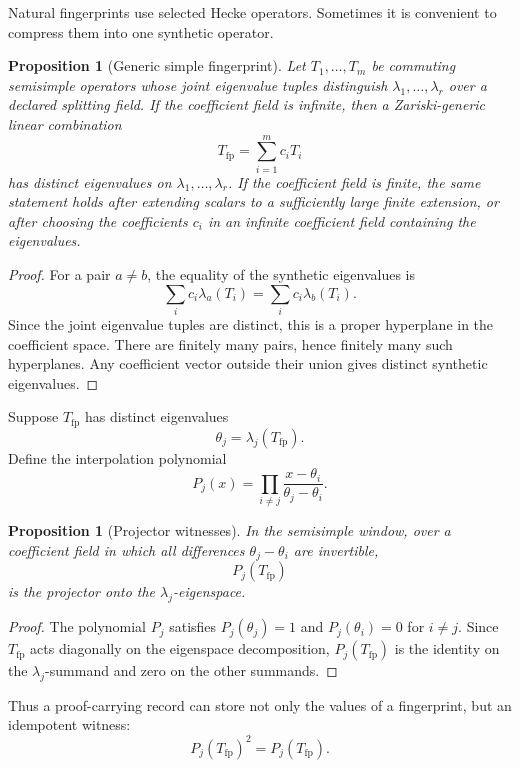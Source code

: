 \documentclass[11pt]{article}
\newtheorem{proposition}[theorem]{Proposition}
\begin{document}
Natural fingerprints use selected Hecke operators.  Sometimes it is convenient to compress them into one synthetic operator.

\begin{proposition}[Generic simple fingerprint]
Let \(T_1,\ldots,T_m\) be commuting semisimple operators whose joint eigenvalue tuples distinguish
\(\lambda_1,\ldots,\lambda_r\) over a declared splitting field.  If the coefficient field is infinite, then a Zariski-generic linear combination
\[
T_{\mathrm{fp}}=\sum_{i=1}^m c_iT_i
\]
has distinct eigenvalues on \(\lambda_1,\ldots,\lambda_r\).  If the coefficient field is finite, the same statement holds after extending scalars to a sufficiently large finite extension, or after choosing the coefficients \(c_i\) in an infinite coefficient field containing the eigenvalues.
\end{proposition}

\begin{proof}
For a pair \(a\neq b\), the equality of the synthetic eigenvalues is
\[
\sum_i c_i\lambda_a(T_i)=\sum_i c_i\lambda_b(T_i).
\]
Since the joint eigenvalue tuples are distinct, this is a proper hyperplane in the coefficient space.  There are finitely many pairs, hence finitely many such hyperplanes.  Any coefficient vector outside their union gives distinct synthetic eigenvalues.
\end{proof}

Suppose \(T_{\mathrm{fp}}\) has distinct eigenvalues
\[
\theta_j=\lambda_j(T_{\mathrm{fp}}).
\]
Define the interpolation polynomial
\[
P_j(x)=
\prod_{i\neq j}\frac{x-\theta_i}{\theta_j-\theta_i}.
\]

\begin{proposition}[Projector witnesses]
In the semisimple window, over a coefficient field in which all differences \(\theta_j-\theta_i\) are invertible,
\[
P_j(T_{\mathrm{fp}})
\]
is the projector onto the \(\lambda_j\)-eigenspace.
\end{proposition}

\begin{proof}
The polynomial \(P_j\) satisfies \(P_j(\theta_j)=1\) and \(P_j(\theta_i)=0\) for \(i\neq j\).  Since \(T_{\mathrm{fp}}\) acts diagonally on the eigenspace decomposition, \(P_j(T_{\mathrm{fp}})\) is the identity on the \(\lambda_j\)-summand and zero on the other summands.
\end{proof}

Thus a proof-carrying record can store not only the values of a fingerprint, but an idempotent witness:
\[
P_j(T_{\mathrm{fp}})^2=P_j(T_{\mathrm{fp}}).
\]
\end{document}
